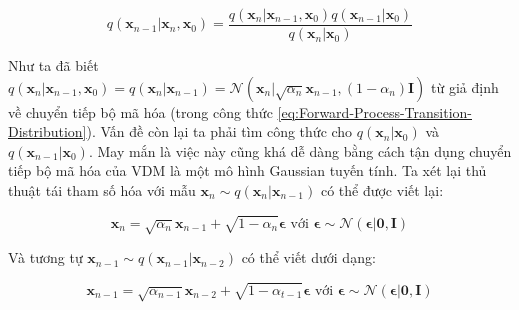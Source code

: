 \documentclass[14pt, a4paper]{article}
\numberwithin{equation}{section}
\numberwithin{figure}{section}
\numberwithin{dl}{section}
\numberwithin{md}{section}
\numberwithin{bd}{section}
\numberwithin{dn}{section}
\numberwithin{hq}{section}
\begin{document}
    \begin{equation}
        q(\boldsymbol{x}_{n-1} \vert \boldsymbol{x}_n, \boldsymbol{x}_0) = \dfrac{q(\boldsymbol{x}_n \vert \boldsymbol{x}_{n-1}, \boldsymbol{x}_0) q(\boldsymbol{x}_{n-1} \vert \boldsymbol{x}_0)}{q(\boldsymbol{x}_n \vert \boldsymbol{x}_0)}
    \end{equation}

    Như ta đã biết $q(\boldsymbol{x}_n \vert \boldsymbol{x}_{n-1}, \boldsymbol{x}_0)=q(\boldsymbol{x}_n \vert \boldsymbol{x}_{n-1})=\mathcal{N}(\boldsymbol{x}_n \vert \sqrt{\alpha_n}\boldsymbol{x}_{n-1}, (1-\alpha_n)\boldsymbol{I})$ từ giả định về chuyển tiếp bộ mã hóa (trong công thức \ref{eq:Forward-Process-Transition-Distribution}).
    Vấn đề còn lại ta phải tìm công thức cho $q(\boldsymbol{x}_n \vert \boldsymbol{x}_0)$ và $q(\boldsymbol{x}_{n-1} \vert \boldsymbol{x}_0)$.
    May mắn là việc này cũng khá dễ dàng bằng cách tận dụng chuyển tiếp bộ mã hóa của VDM là một mô hình Gaussian tuyến tính.
    Ta xét lại thủ thuật tái tham số hóa với mẫu $\boldsymbol{x}_n \sim q(\boldsymbol{x}_n \vert \boldsymbol{x}_{n-1})$ có thể được viết lại:

    \begin{equation}
        \boldsymbol{x}_n = \sqrt{\alpha_n} \boldsymbol{x}_{n-1} + \sqrt{1 - \alpha_n} \boldsymbol{\epsilon} \text{ với } \boldsymbol{\epsilon} \sim \mathcal{N} (\boldsymbol{\epsilon} \vert \boldsymbol{0}, \boldsymbol{I})
    \end{equation}

    Và tương tự $\boldsymbol{x}_{n-1} \sim q(\boldsymbol{x}_{n-1} \vert \boldsymbol{x}_{n-2})$ có thể viết dưới dạng:

    \begin{equation}
        \boldsymbol{x}_{n-1} = \sqrt{\alpha_{n-1}} \boldsymbol{x}_{n-2} + \sqrt{1 - \alpha_{t-1}} \boldsymbol{\epsilon} \text{ với } \boldsymbol{\epsilon} \sim \mathcal{N} (\boldsymbol{\epsilon} \vert \boldsymbol{0}, \boldsymbol{I})
    \end{equation}
\end{document}
